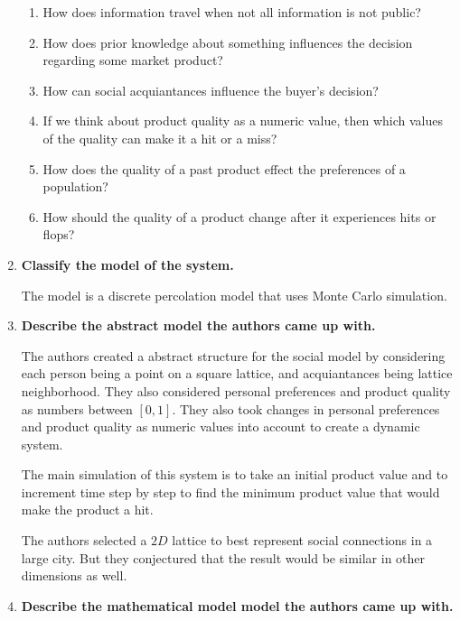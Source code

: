 \documentclass[article, 11pt, a4paper, oneside]{memoir}
\begin{document}
\begin{enumerate}[left=0pt, itemsep=20pt, label={\(\square\)}]
        \begin{enumerate}
            \item How does information travel when not all information is not public?
            \item How does prior knowledge about something influences the decision
                regarding some market product?
            \item How can social acquiantances influence the buyer's decision?
            \item If we think about product quality as a numeric value, then which values
                of the quality can make it a hit or a miss?
            \item How does the quality of a past product effect the preferences of a
                population?
            \item How should the quality of a product change after it experiences hits or
                flops?
        \end{enumerate}

    \item \textbf{Classify the model of the system. }

        The model is a discrete percolation model that uses Monte Carlo simulation.

    \item \textbf{Describe the abstract model the authors came up with. }

        The authors created a abstract structure for the social model by considering each
        person being a point on a square lattice, and acquiantances being lattice
        neighborhood. They also considered personal preferences and product quality as
        numbers between \([0, 1]\). They also took changes in personal preferences and
        product quality as numeric values into account to create a dynamic system.

        The main simulation of this system is to take an initial product value and to
        increment time step by step to find the minimum product value that would make the
        product a hit. 
        
        The authors selected a \(2D\) lattice to best represent social connections in a
        large city. But they conjectured that the result would be similar in other
        dimensions as well.

    \item \textbf{Describe the mathematical model model the authors came up with.  }


\end{enumerate}
\end{document}
